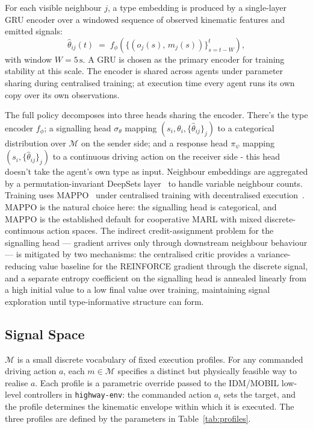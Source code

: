 \documentclass[12pt,a4paper]{article}
\begin{document}
For each visible neighbour $j$, a type embedding is produced by a single-layer GRU encoder
over a windowed sequence of observed kinematic features and emitted signals:
\[
    \hat{\theta}_{ij}(t) \;=\; f_\phi\!\left(\bigl\{(o_j(s),\, m_j(s))\bigr\}_{s=t-W}^{t}\right),
\]
with window $W = 5\,\text{s}$. A GRU is chosen as the primary encoder for training stability at
this scale. The encoder is shared across agents under parameter sharing during centralised training; at execution time every agent runs its own copy over its own observations.

The full policy decomposes into three heads sharing the encoder. There's the type encoder
$f_\phi$; a signalling head $\sigma_\theta$ mapping $(s_i, \theta_i, \{\hat{\theta}_{ij}\}_j)$ to
a categorical distribution over $\mathcal{M}$ on the sender side; and a response head $\pi_\psi$
mapping $(s_i, \{\hat{\theta}_{ij}\}_j)$ to a continuous driving action on the receiver side - this
head doesn't take the agent's own type as input. Neighbour embeddings are aggregated by a
permutation-invariant DeepSets layer~\cite{zaheer2017deep} to handle variable neighbour counts.
Training uses MAPPO~\cite{yu2022surprising} under centralised training with decentralised
execution~\cite{lowe2017multi}. MAPPO is the natural choice here: the signalling head is
categorical, and MAPPO is the established default for cooperative MARL with mixed
discrete-continuous action spaces. The indirect credit-assignment problem for the signalling
head --- gradient arrives only through downstream neighbour behaviour --- is mitigated by two
mechanisms: the centralised critic provides a variance-reducing value baseline for the
REINFORCE gradient through the discrete signal, and a separate entropy coefficient on the
signalling head is annealed linearly from a high initial value to a low final value over
training, maintaining signal exploration until type-informative structure can form.

\subsection{Signal Space}

$\mathcal{M}$ is a small discrete vocabulary of fixed execution profiles. For any commanded
driving action $a$, each $m \in \mathcal{M}$ specifies a distinct but physically feasible way to
realise $a$. Each profile is a parametric override passed to the IDM/MOBIL low-level controllers
in \texttt{highway-env}: the commanded action $a_i$ sets the target, and the profile determines
the kinematic envelope within which it is executed. The three profiles are defined by the
parameters in Table~\ref{tab:profiles}.
\end{document}
